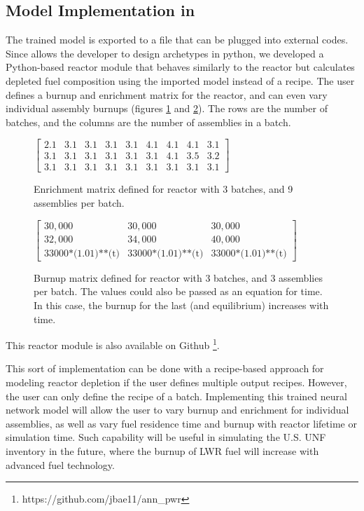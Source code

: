 \subsection{Model Implementation in \Cyclus}

The trained model is exported to a file
that can be plugged into external codes. Since \Cyclus
allows the developer
to design archetypes in python, we developed a Python-based reactor
module that behaves similarly to the \Cycamore reactor
but calculates depleted fuel composition using the
imported model instead of a recipe. The user defines a burnup
and enrichment
matrix for the reactor, and can even vary individual
assembly burnups (figures \ref{fig:enr_mat} and \ref{fig:bu_mat}). The rows are the number
of batches, and the columns are the number of
assemblies in a batch.
\begin{figure}
\centering
\(
\begin{bmatrix}
2.1 & 3.1 & 3.1 & 3.1 & 3.1 & 4.1 & 4.1 & 4.1 & 3.1 \\
3.1 & 3.1 & 3.1 & 3.1 & 3.1 & 3.1 & 4.1 & 3.5 & 3.2 \\
3.1 & 3.1 & 3.1 & 3.1 & 3.1 & 3.1 & 3.1 & 3.1 & 3.1
\end{bmatrix}
\)
\caption{Enrichment matrix defined for reactor with 3 batches,
         and 9 assemblies per batch.}
\label{fig:enr_mat}
\end{figure}

\begin{figure}
\centering
\(
\begin{bmatrix}
30,000 & 30,000 & 30,000 \\
32,000 & 34,000 & 40,000 \\
\text{33000*(1.01)**(t)} & \text{33000*(1.01)**(t)} & \text{33000*(1.01)**(t)}
\end{bmatrix}
\)
\caption{Burnup matrix defined for reactor with 3 batches, and 3 assemblies
         per batch. The values could also be passed as an equation for time. In this case, the burnup for the last (and equilibrium) increases with time.}
\label{fig:bu_mat}
\end{figure}

This reactor module is also
available on Github \footnote{https://github.com/jbae11/ann\_pwr}.

This sort of implementation can be done with
a recipe-based approach for modeling reactor depletion
if the user defines multiple
output recipes. However, the user can only define
the recipe of a batch.
Implementing this trained neural network model will allow the user to vary
burnup and enrichment for individual assemblies, as well
as vary fuel residence time and burnup with reactor
lifetime or simulation time. Such capability will be
useful in simulating the U.S. \gls{UNF} inventory in the future,
where the burnup of \gls{LWR} fuel will increase
with advanced fuel technology.